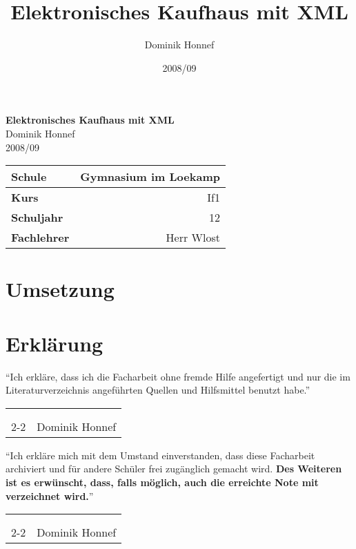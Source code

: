 \documentclass[12pt,oneside,ngerman,a4paper,bibgerm]{scrreprt}
\author{Dominik Honnef}
\title{Elektronisches Kaufhaus mit XML}
\date{2008/09}
\makeatletter
\newcommand{\signature}[1]{
  \vspace*{\bigskipamount}
  \hfill
  \begin{tabularx}{0.95\linewidth}{Xr}
    \\
    \\
    \\
    \cline{2-2}
    & \makebox[4cm][r]#1
  \end{tabularx}
  \vspace*{\bigskipamount}
}
\renewcommand*{\lstlistoflistings}{%
  \begingroup
    \if@twocolumn
      \@restonecoltrue\onecolumn
    \else
      \@restonecolfalse
    \fi
    \lol@heading
    \setlength{\parskip}{\z@}%
    \setlength{\parindent}{\z@}%
    \setlength{\parfillskip}{\z@ \@plus 1fil}%
    \@starttoc{lol}%
    \if@restonecol\twocolumn\fi
  \endgroup
}
\renewcommand*{\chapterpagestyle}{scrheadings}
\makeatother
\begin{document}
\onehalfspacing
\clearpage
\begingroup
{}
\renewcommand*{\chapterpagestyle}{empty}
\pagestyle{empty}
\vspace*{\fill}
\begin{center}
  \textbf{\huge{Elektronisches Kaufhaus mit XML}} \\
  \bigskip
  \small{Dominik Honnef} \\
  \bigskip
  \small{2008/09}
\end{center}
\vspace*{\fill}
\begin{tabular}{|l|r|}
  \hline
  \textbf{Schule} & Gymnasium im Loekamp \\
  \hline
  \textbf{Kurs} & If1 \\
  \hline
  \textbf{Schuljahr} & 12 \\
  \hline
  \textbf{Fachlehrer} & Herr Wlost \\
  \hline
\end{tabular}
\clearpage
\tableofcontents{}
\clearpage
\endgroup
\newpage

\chapter{Umsetzung}
\lstlistoflistings
\listoffigures



\nocite{pdf:xslt}
\nocite{pdf:xquery}
\nocite{pdf:xml}
\nocite{pdf:xslfo}
\nocite{wiki:de:xml}
\nocite{book:phpmysql}

\chapter*{Erklärung}
"`Ich erkläre, dass ich die Facharbeit ohne fremde
Hilfe angefertigt und nur die
im Literaturverzeichnis angeführten Quellen und Hilfsmittel benutzt habe."' \\
\signature{Dominik Honnef}

"`Ich erkläre mich mit dem Umstand einverstanden, dass diese
Facharbeit archiviert und für andere Schüler frei zugänglich gemacht
wird. \textbf{Des Weiteren ist es erwünscht, dass, falls möglich, auch die
erreichte Note mit verzeichnet wird.}"' \\
\signature{Dominik Honnef}
\end{document}
